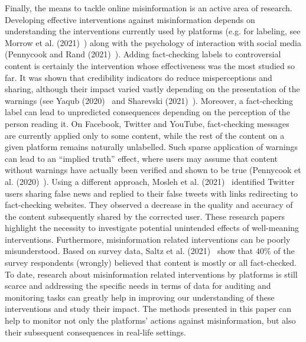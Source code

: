 \documentclass{article}
\begin{document}
Finally, the means to tackle online misinformation is an active area of research. Developing effective interventions against misinformation depends on understanding the interventions currently used by platforms (e.g. for labeling, see Morrow et al. (2021)~\cite{morrow}) along with the psychology of interaction with social media (Pennycook and Rand (2021)~\cite{pennycook2021psychology}). 
Adding fact-checking labels to controversial content is certainly the intervention whose effectiveness was the most studied so far. 
It was shown that credibility indicators do reduce misperceptions and sharing, although their impact varied vastly depending on the presentation of the warnings (see Yaqub (2020)~\cite{yaqub2020effects} and Sharevski (2021)~\cite{sharevski2021misinformation}).
Moreover, a fact-checking label can lead to unpredicted consequences depending on the perception of the person reading it.
On Facebook, Twitter and YouTube, fact-checking messages are currently applied only to some content, while the rest of the content on a given platform remains naturally unlabelled. 
Such sparse application of warnings can lead to an ``implied truth'' effect, where users may assume that content without warnings have actually been verified and shown to be true (Pennycook et al. (2020)~\cite{pennycook2020implied}).
Using a different approach, Mosleh et al. (2021)~\cite{mosleh2021perverse} identified Twitter users sharing false news and replied to their false tweets with links redirecting to fact-checking websites.
They observed a decrease in the quality and accuracy of the content subsequently shared by the corrected user. 
These research papers highlight the necessity to investigate potential unintended effects of well-meaning interventions. Furthermore, misinformation related interventions can be poorly misunderstood. Based on survey data, Saltz et al. (2021)~\cite{saltzbarrari} show that $40\%$ of the survey respondents (wrongly) believed that content is mostly or all fact-checked. To date, research about misinformation related interventions by platforms is still scarce and addressing the specific needs in terms of data for auditing and monitoring tasks can greatly help in improving our understanding of these interventions and study their impact.  
The methods presented in this paper can help to monitor not only the platforms' actions against misinformation, but also their subsequent consequences in real-life settings.


	
\end{document}

